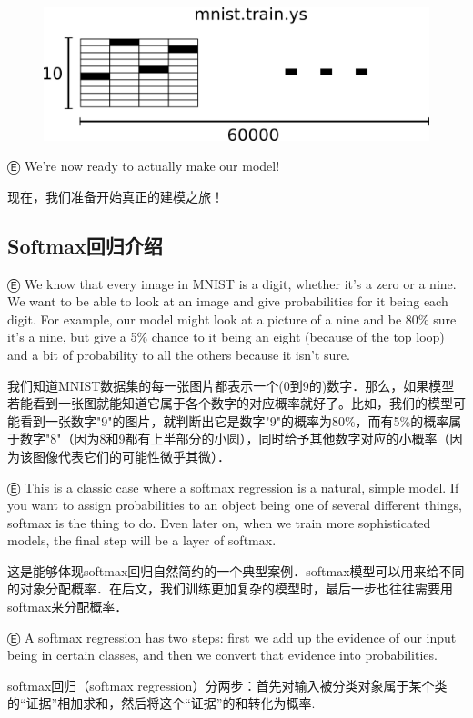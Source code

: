 \begin{figure}[htbp]
\centering
\includegraphics[width=.7\textwidth]{../SOURCE/images/mnist-train-ys.png}
\caption{}
\end{figure}

Ⓔ We're now ready to actually make our model!

现在，我们准备开始真正的建模之旅！

\subsection {Softmax回归介绍}

Ⓔ We know that every image in MNIST is a digit, whether it's a zero or a nine. We want to be able to look at an image and give probabilities for it being each digit. For example, our model might look at a picture of a nine and be 80\% sure it's a nine, but give a 5\% chance to it being an eight (because of the top loop) and a bit of probability to all the others because it isn't sure.

我们知道MNIST数据集的每一张图片都表示一个(0到9的)数字．那么，如果模型若能看到一张图就能知道它属于各个数字的对应概率就好了。比如，我们的模型可能看到一张数字"9"的图片，就判断出它是数字"9"的概率为80\%，而有5\%的概率属于数字"8"（因为8和9都有上半部分的小圆），同时给予其他数字对应的小概率（因为该图像代表它们的可能性微乎其微）．

Ⓔ This is a classic case where a softmax regression is a natural, simple model. If you want to assign probabilities to an object being one of several different things, softmax is the thing to do. Even later on, when we train more sophisticated models, the final step will be a layer of softmax.

这是能够体现softmax回归自然简约的一个典型案例．softmax模型可以用来给不同的对象分配概率．在后文，我们训练更加复杂的模型时，最后一步也往往需要用softmax来分配概率．

Ⓔ A softmax regression has two steps: first we add up the evidence of our input being in certain classes, and then we convert that evidence into probabilities.

softmax回归（softmax regression）分两步：首先对输入被分类对象属于某个类的“证据”相加求和，然后将这个“证据”的和转化为概率.


